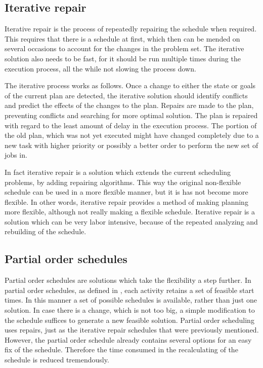 \documentclass{article}
\begin{document}
\subsection{Iterative repair}
Iterative repair is the process of repeatedly repairing the schedule when required.
This requires that there is a schedule at first, which then can be mended on several occasions to account for the changes in the problem set.
The iterative solution also needs to be fast, for it should be run multiple times during the execution process, all the while not slowing the process down.

The iterative process works as follows.
Once a change to either the state or goals of the current plan are detected, the iterative solution should identify conflicts and predict the effects of the changes to the plan.
Repairs are made to the plan, preventing conflicts and searching for more optimal solution.
The plan is repaired with regard to the least amount of delay in the execution process.
The portion of the old plan, which was not yet executed might have changed completely due to a new task with higher priority or possibly a better order to perform the new set of jobs in.
\cite{chien00}

In fact iterative repair is a solution which extends the current scheduling problems, by adding repairing algorithms.
This way the original non-flexible schedule can be used in a more flexible manner, but it is has not become more flexible.
In other words, iterative repair provides a method of making planning more flexible, although not really making a flexible schedule.
Iterative repair is a solution which can be very labor intensive, because of the repeated analyzing and rebuilding of the schedule.

\subsection{Partial order schedules}
Partial order schedules are solutions which take the flexibility a step further.
In partial order schedules, as defined in \cite{policella07}, each activity retains a set of feasible start times.
In this manner a set of possible schedules is available, rather than just one solution.
In case there is a change, which is not too big, a simple modification to the schedule suffices to generate a new feasible solution.
Partial order scheduling uses repairs, just as the iterative repair schedules that were previously mentioned.
However, the partial order schedule already contains several options for an easy fix of the schedule.
Therefore the time consumed in the recalculating of the schedule is reduced tremendously.
\end{document}
